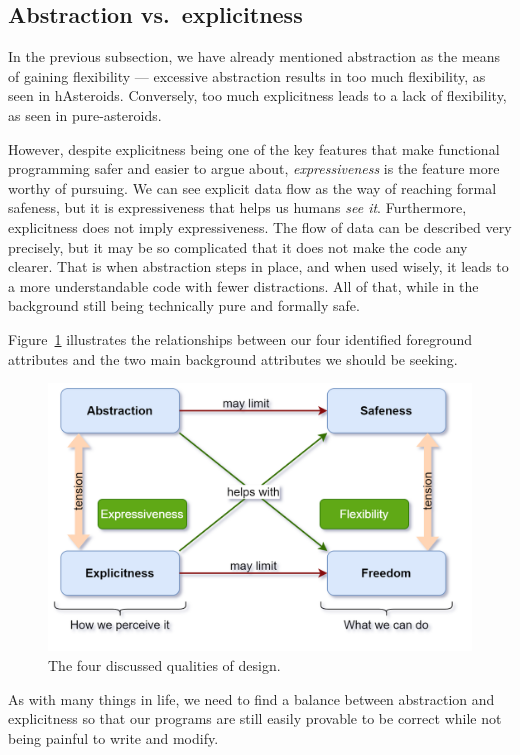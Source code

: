 \documentclass[
  digital, %
  color,   %
  table,   %
  oneside, %
  lof,     %
  lot,     %
]{fithesis3}
\newcommand{\vs}{vs.\ }
\begin{document}
{\subsection{Abstraction \vs explicitness}

In the previous subsection, we have already mentioned abstraction as the means
of gaining flexibility --- excessive abstraction results in too much flexibility,
as seen in hAsteroids. Conversely, too much explicitness leads to a lack of flexibility,
as seen in pure-asteroids.

However, despite explicitness being one of the key features that make functional
programming safer and easier to argue about, \emph{expressiveness} is the feature
more worthy of pursuing. We can see explicit data flow as the way of reaching
formal safeness, but it is expressiveness that helps us humans \emph{see it}.
Furthermore, explicitness does not imply expressiveness. The flow of data can be
described very precisely, but it may be so complicated that it does not make the code any clearer.
That is when abstraction steps in place, and when used wisely, it leads to a
more understandable code with fewer distractions. All of that, while in the background
still being technically pure and formally safe.

Figure~\ref{fig:4sides} illustrates the relationships between our four identified
foreground attributes and the two main background attributes we should be seeking.
\begin{figure}
    \centering
    \includegraphics[width=\textwidth]{images/4sides-of-code.png}
    \caption{The four discussed qualities of design.}
    \label{fig:4sides}
\end{figure}

As with many things in life, we need to find a balance
between abstraction and explicitness so that our programs are still
easily provable to be correct while not being painful to write and modify.

}
\end{document}
